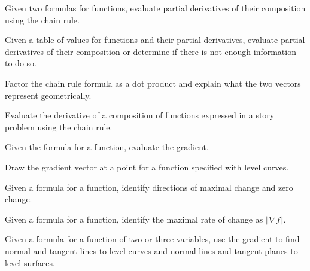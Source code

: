 \documentclass[11pt, oneside]{article}
\newcounter{objective}
\newcommand{\red}[1] {{\color{red} #1}}
\begin{document}
	\begin{objectives}
		\item 
		\begin{subobjectives}
			\item \red{Given two formulas for functions, evaluate partial derivatives of their composition using the chain rule.} 
			\item Given a table of values for functions and their partial derivatives, evaluate partial derivatives of their composition or determine if there is not enough information to do so.
			\item Factor the chain rule formula as a dot product \red{and explain what the two vectors represent geometrically.}
		\end{subobjectives}
		\item Evaluate the derivative of a composition of functions expressed in a story problem using the chain rule.
	\end{objectives}

	\threshold[Grad]{Gradients}
	\begin{objectives}
		\item 
		\begin{subobjectives}
			\item Given the formula for a function, evaluate the gradient.
			\item Draw the gradient vector at a point for a function specified with level curves.
		\end{subobjectives}
		\item
		\begin{subobjectives}
			\item Given a formula for a function, identify directions of maximal change and zero change.
			\item Given a formula for a function, identify the maximal rate of change as $\Vert \nabla f\Vert$.
		\end{subobjectives}
		\item Given a formula for a function of two or three variables, use the gradient to find normal and tangent lines to level curves and normal lines and tangent planes to level surfaces.
	\end{objectives}
\end{document}
